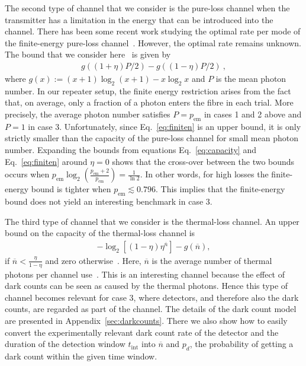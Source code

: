 \documentclass[aps,pra,reprint,superscriptaddress]{revtex4-1}
\begin{document}
The second type of channel that we consider is the pure-loss channel when the transmitter has a limitation in the energy that can be introduced into the channel. There has been some recent work studying the optimal rate per mode of the finite-energy pure-loss channel~\cite{takeoka2014squashed,goodenough2016assessing,wilde2016energy}. However, the optimal rate remains unknown. The bound that we consider here~\cite{takeoka2014squashed} is given by
\begin{align}
g\left(\left(1+\eta\right)P/2\right) - g\left(\left(1-\eta\right)P/2\right)\label{eq:finiten}\ ,
\end{align}
where $g(x) := \left(x+1\right)\log_2(x+1)-x\log_2x$ and $P$ is the mean photon number. In our repeater setup, the finite energy restriction arises from the fact that, on average, only a fraction of a photon enters the fibre in each trial. More precisely, the average photon number satisfies $P = p_{\textrm{em}}$ in cases 1 and 2 above and $P=1$ in case 3. Unfortunately, since Eq.~\eqref{eq:finiten} is an upper bound, it is only strictly smaller than the capacity of the pure-loss channel for small mean photon number.
Expanding the bounds from equations Eq.~\eqref{eq:capacity} and Eq.~\eqref{eq:finiten} around $\eta = 0$ shows that the cross-over between the two bounds occurs when $p_{\textrm{em}}\log_2\left(\frac{p_{\textrm{em}}+2}{p_{\textrm{em}}}\right) = \frac{1}{\ln2}$. In other words, for high losses the finite-energy bound is tighter when $p_{\textrm{em}}\lesssim 0.796$. This implies that the finite-energy bound does not yield an interesting benchmark in case 3.

The third type of channel that we consider is the thermal-loss channel. An upper bound on the capacity of the thermal-loss channel is
\begin{gather}
-\log_2[\left(1-\eta\right)\eta^{\overline{n}}]-g\left(\overline{n}\right),
\end{gather}
if $\overline{n}<\frac{\eta}{1-\eta}$ and zero otherwise~\cite{pirandola2015fundamental}. Here, $\overline{n}$ is the average number of thermal photons per channel use~\cite{Weedbrook:2012aa}. This is an interesting channel because the effect of dark counts can be seen as caused by the thermal photons. Hence this type of channel becomes relevant for case 3, where detectors, and therefore also the dark counts, are regarded as part of the channel. The details of the dark count model are presented in Appendix~\ref{sec:darkcounts}. There we also show how to easily convert the experimentally relevant dark count rate of the detector and the duration of the detection window $t_{\textrm{int}}$ into $\overline{n}$ and $p_d$, the probability of getting a dark count within the given time window.
\end{document}
